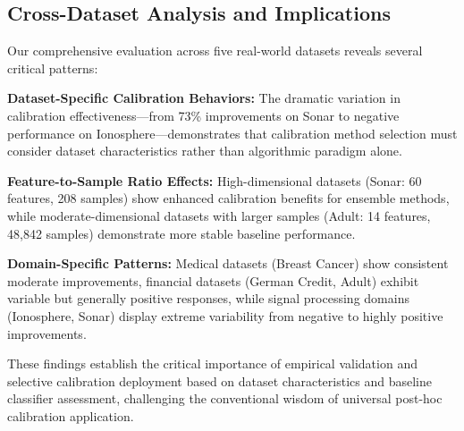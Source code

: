 \documentclass[12pt, a4paper]{article}
\begin{document}
\subsection{Cross-Dataset Analysis and Implications}

Our comprehensive evaluation across five real-world datasets reveals several critical patterns:

\textbf{Dataset-Specific Calibration Behaviors:} The dramatic variation in calibration effectiveness—from 73\% improvements on Sonar to negative performance on Ionosphere—demonstrates that calibration method selection must consider dataset characteristics rather than algorithmic paradigm alone.

\textbf{Feature-to-Sample Ratio Effects:} High-dimensional datasets (Sonar: 60 features, 208 samples) show enhanced calibration benefits for ensemble methods, while moderate-dimensional datasets with larger samples (Adult: 14 features, 48,842 samples) demonstrate more stable baseline performance.

\textbf{Domain-Specific Patterns:} Medical datasets (Breast Cancer) show consistent moderate improvements, financial datasets (German Credit, Adult) exhibit variable but generally positive responses, while signal processing domains (Ionosphere, Sonar) display extreme variability from negative to highly positive improvements.

These findings establish the critical importance of empirical validation and selective calibration deployment based on dataset characteristics and baseline classifier assessment, challenging the conventional wisdom of universal post-hoc calibration application.


\newpage

 

\end{document}
